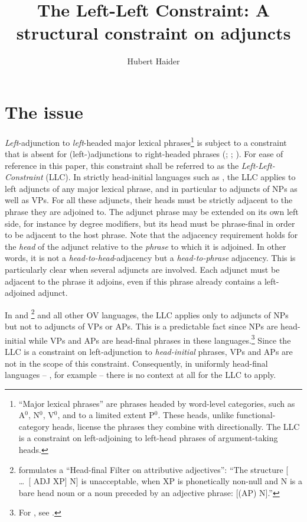 \documentclass[output=paper
  ,nobabel
  ,uniformtopskip %
]{langscibook}
\title{The Left-Left Constraint: A structural constraint on adjuncts}
\author{Hubert Haider\orcid{0000-0001-7052-7607}\affiliation{University of Salzburg}}
\begin{document}
\maketitle

\section{The issue}\label{sec-issue}

\emph{Left}-adjunction to \emph{left}-headed major lexical phrases\footnote{%
  ``Major lexical phrases'' are phrases headed by word-level categories, such as A$^0$, N$^0$, V$^0$, and to a
  limited extent P$^0$. These heads, unlike functional-category heads, license the phrases they combine with directionally. The LLC is a constraint on left-adjoining to left-head phrases of argument-taking heads.}  
is subject to a constraint that is absent for (left-)adjunctions to
right-headed phrases (\citealp[782--785]{Haider2004}; \citealp[194]{Haider2010}; \citealp[13--16,
34--37]{Haider2013}). For ease of reference in this paper, this constraint shall be referred to as
the \emph{Left-Left-Constraint} (LLC). In strictly head-initial languages such as , the LLC
applies to left adjuncts of any major lexical phrase, and in particular to adjuncts of NPs as well
as VPs. For all these adjuncts, their heads must be strictly adjacent to the phrase they are
adjoined to. The adjunct phrase may be extended on its own left side, for instance by degree
modifiers, but its head must be phrase-final in order to be adjacent to the host phrase. Note that
the adjacency requirement holds for the \emph{head} of the adjunct relative to the \emph{phrase} to
which it is adjoined. In other words, it is not a \emph{head-to-head}-adjacency but a
\emph{head-to-phrase} adjacency. This is particularly clear when several adjuncts are involved. Each
adjunct must be adjacent to the phrase it adjoins, even if this phrase already contains a
left-adjoined adjunct.

In  and %
\footnote{\citet[292]{Broekhuis2013} formulates a ``Head-final Filter on attributive adjectives'':
``The structure [ \ldots\ [ ADJ XP] N\sharp] is unacceptable, when XP is phonetically non-null and N\sharp{} is a bare head noun or a noun preceded by an adjective phrase: [(AP) N].''
}
and all other  OV languages, the LLC applies only to adjuncts of NPs but not to adjuncts of\kern1pt{}
VPs or APs. This is a predictable fact since NPs are head-initial while VPs and APs are head-final phrases in these languages.\footnote{For , see \citet*[291--293]{Broekhuis2013}.}  Since the LLC is a constraint on left-adjunction to \emph{head-initial} phrases, VPs and APs are not in the scope of this constraint. Consequently, in uniformly head-final languages – , for example – there is no context at all for the LLC to apply.
\end{document}
